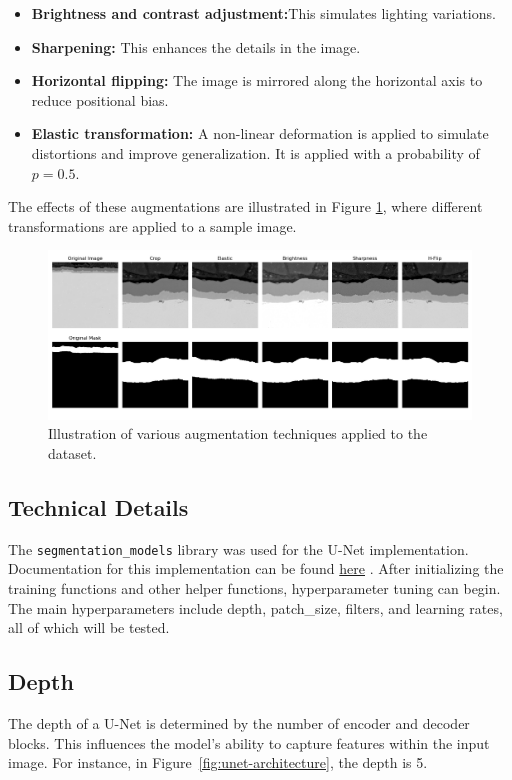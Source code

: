 \begin{itemize}
    \item \textbf{Brightness and contrast adjustment:}This simulates lighting variations.
    \item \textbf{Sharpening:} This enhances the details in the image.
    \item \textbf{Horizontal flipping:} The image is mirrored along the horizontal axis to reduce positional bias.
    \item \textbf{Elastic transformation:} A non-linear deformation is applied to simulate distortions and improve generalization. It is applied with a probability of $p=0.5$.
\end{itemize}

The effects of these augmentations are illustrated in Figure \ref{fig:augmentation}, where different transformations are applied to a sample image.

\begin{figure}[H]
\centering
\includegraphics[width=1\linewidth]{PICTURES/augumentation.png}
\caption{Illustration of various augmentation techniques applied to the dataset.}
\label{fig:augmentation}
\end{figure}

\subsection{Technical Details}
The \texttt{segmentation\_models} library \cite{Iakubovskii:2019} was used for the U-Net implementation. Documentation for this implementation can be found \href{https://smp.readthedocs.io/en/latest/models.html#id21}{here} \cite{Iakubovskii_2019}. After initializing the training functions and other helper functions, hyperparameter tuning can begin. The main hyperparameters include depth, patch\_size, filters, and learning rates, all of which will be tested.

\subsection{Depth}
The depth of a U-Net is determined by the number of encoder and decoder blocks. This influences the model's ability to capture features within the input image. For instance, in Figure~\ref{fig:unet-architecture}, the depth is 5.

